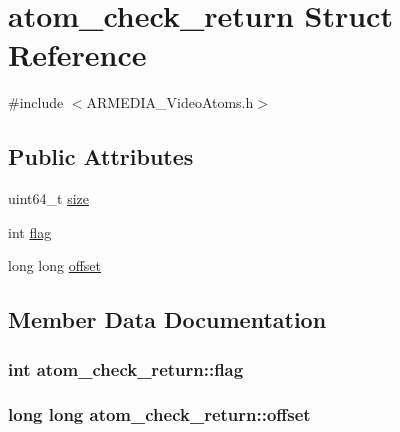 \hypertarget{structatom__check__return}{}\section{atom\+\_\+check\+\_\+return Struct Reference}
\label{structatom__check__return}


{\ttfamily \#include $<$A\+R\+M\+E\+D\+I\+A\+\_\+\+Video\+Atoms.\+h$>$}

\subsection*{Public Attributes}
\begin{DoxyCompactItemize}
\item 
uint64\+\_\+t \hyperlink{structatom__check__return_a148c2afad99e3fd63bb3d75bc88ce665}{size}
\item 
int \hyperlink{structatom__check__return_a2ac29172dd0972862e968bf949df4cdc}{flag}
\item 
long long \hyperlink{structatom__check__return_a1014d6c472da33f04fb5910659acdd0b}{offset}
\end{DoxyCompactItemize}


\subsection{Member Data Documentation}
\subsubsection[{\texorpdfstring{flag}{flag}}]{\setlength{\rightskip}{0pt plus 5cm}int atom\+\_\+check\+\_\+return\+::flag}\hypertarget{structatom__check__return_a2ac29172dd0972862e968bf949df4cdc}{}\label{structatom__check__return_a2ac29172dd0972862e968bf949df4cdc}
\subsubsection[{\texorpdfstring{offset}{offset}}]{\setlength{\rightskip}{0pt plus 5cm}long long atom\+\_\+check\+\_\+return\+::offset}\hypertarget{structatom__check__return_a1014d6c472da33f04fb5910659acdd0b}{}\label{structatom__check__return_a1014d6c472da33f04fb5910659acdd0b}
